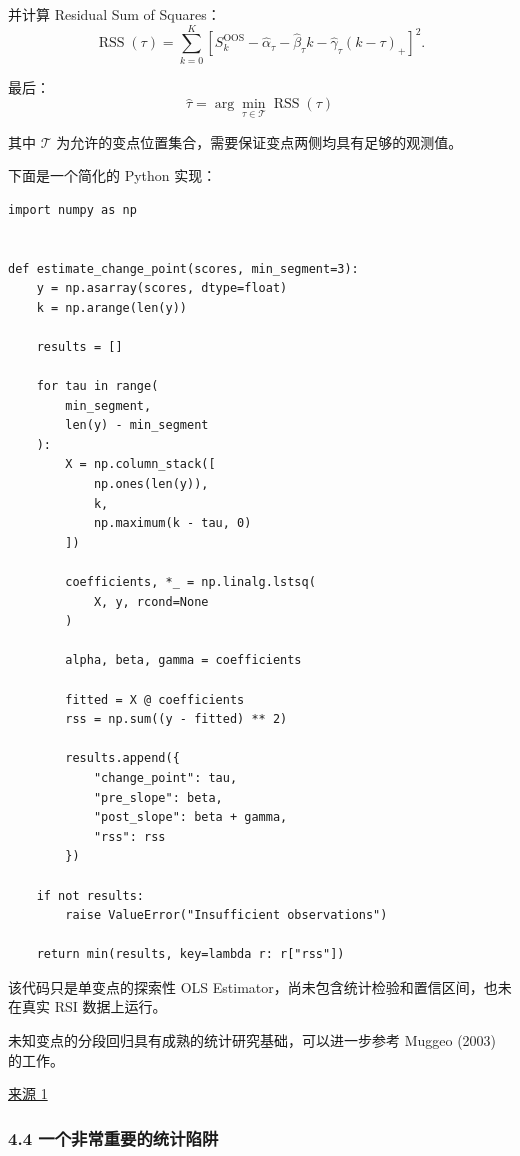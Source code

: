 并计算 Residual Sum of Squares：
\[\operatorname{RSS}(\tau)
=
\sum_{k=0}^{K}
\left[
S_k^{\mathrm{OOS}}
-\hat\alpha_\tau
-\hat\beta_\tau k
-\hat\gamma_\tau(k-\tau)_+
\right]^2.\]

最后：
\[\boxed{
\hat\tau=
\arg\min_{\tau\in\mathcal T}
\operatorname{RSS}(\tau)
}\]

其中 \(\mathcal T\) 为允许的变点位置集合，需要保证变点两侧均具有足够的观测值。

下面是一个简化的 Python 实现：

\begin{verbatim}
import numpy as np


def estimate_change_point(scores, min_segment=3):
    y = np.asarray(scores, dtype=float)
    k = np.arange(len(y))

    results = []

    for tau in range(
        min_segment,
        len(y) - min_segment
    ):
        X = np.column_stack([
            np.ones(len(y)),
            k,
            np.maximum(k - tau, 0)
        ])

        coefficients, *_ = np.linalg.lstsq(
            X, y, rcond=None
        )

        alpha, beta, gamma = coefficients

        fitted = X @ coefficients
        rss = np.sum((y - fitted) ** 2)

        results.append({
            "change_point": tau,
            "pre_slope": beta,
            "post_slope": beta + gamma,
            "rss": rss
        })

    if not results:
        raise ValueError("Insufficient observations")

    return min(results, key=lambda r: r["rss"])
\end{verbatim}

该代码只是单变点的探索性 OLS Estimator，尚未包含统计检验和置信区间，也未在真实 RSI 数据上运行。

未知变点的分段回归具有成熟的统计研究基础，可以进一步参考 Muggeo (2003) 的工作。

\href{https://doi.org/10.1002/sim.1545}{来源 1}

\hypertarget{part-3-48-0001-ux4e00ux4e2aux975eux5e38ux91cdux8981ux7684ux7edfux8ba1ux9677ux9631}{%
\subsubsection{4.4 一个非常重要的统计陷阱}\label{part-3-48-0001-ux4e00ux4e2aux975eux5e38ux91cdux8981ux7684ux7edfux8ba1ux9677ux9631}}

